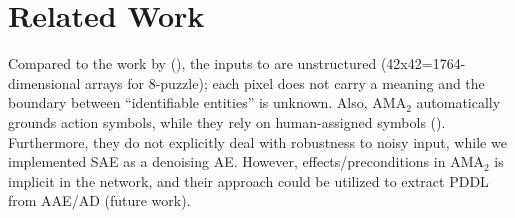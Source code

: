 \documentclass[11pt]{article}
\begin{document}
\section{Related Work}
\label{sec:related}


Compared to the work by \citeauthor{KonidarisKL14} (\citeyear{KonidarisKL14}),
the inputs to \latentplanner are unstructured (42x42=1764-dimensional arrays for 8-puzzle);
each pixel does not carry a meaning and the boundary between ``identifiable entities'' is unknown.
Also, AMA$_2$ automatically grounds action symbols, while they rely on human-assigned symbols ().
Furthermore, they do not explicitly deal with robustness to noisy input, while we implemented SAE as a denoising AE.
However, effects/preconditions in AMA$_2$ is implicit in the network, and their approach could be utilized to extract PDDL from AAE/AD (future work).


%
\end{document}
